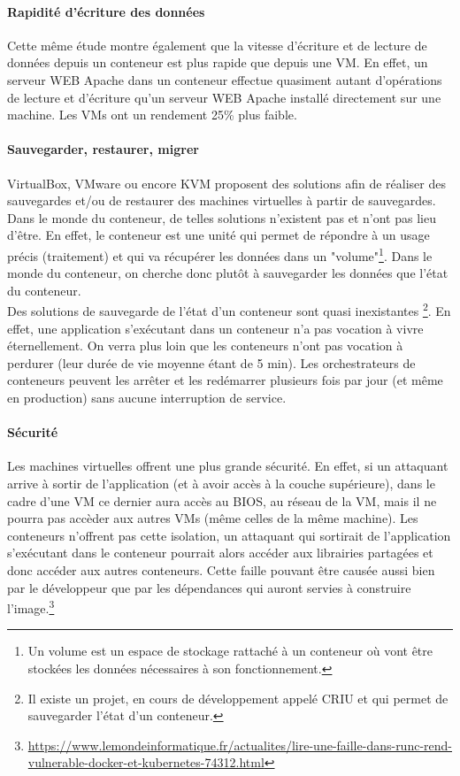 \documentclass[11pt,fleqn]{book} %
\begin{document}
\paragraph{Rapidité d'écriture des données}
Cette même étude montre également que la vitesse d'écriture et de lecture de données depuis un conteneur est plus rapide que depuis une VM. En effet, un serveur WEB Apache dans un conteneur effectue quasiment autant d'opérations de lecture et d'écriture qu'un serveur WEB Apache installé directement sur une machine. Les VMs ont un rendement 25\% plus faible. 

\paragraph{Sauvegarder, restaurer, migrer}
VirtualBox, VMware ou encore KVM proposent des solutions afin de réaliser des sauvegardes et/ou de restaurer des machines virtuelles à partir de sauvegardes.\\

Dans le monde du conteneur, de telles solutions n'existent pas et n'ont pas lieu d'être. En effet, le conteneur est une unité qui permet de répondre à un usage précis (traitement) et qui va récupérer les données dans un "volume"\footnote{Un volume est un espace de stockage rattaché à un conteneur où vont être stockées les données nécessaires à son fonctionnement.}. Dans le monde du conteneur, on cherche donc plutôt à sauvegarder les données que l'état du conteneur.\\  

Des solutions de sauvegarde de l'état d'un conteneur sont quasi inexistantes \footnote{Il existe un projet, en cours de développement appelé CRIU et qui permet de sauvegarder l'état d'un conteneur.}. En effet, une application s'exécutant dans un conteneur n'a pas vocation à vivre éternellement. On verra plus loin que les conteneurs n'ont pas vocation à perdurer (leur durée de vie moyenne étant de 5 min). Les orchestrateurs de conteneurs peuvent les arrêter et les redémarrer plusieurs fois par jour (et même en production) sans aucune interruption de service.

\paragraph{Sécurité}
Les machines virtuelles offrent une plus grande sécurité. En effet, si un attaquant arrive à sortir de l'application (et à avoir accès à la couche supérieure), dans le cadre d'une VM ce dernier aura accès au BIOS, au réseau de la VM, mais il ne pourra pas accèder aux autres VMs (même celles de la même machine). Les conteneurs n'offrent pas cette isolation, un attaquant qui sortirait de l'application s'exécutant dans le conteneur pourrait alors accéder aux librairies partagées et donc accéder aux autres conteneurs. Cette faille pouvant être causée aussi bien par le développeur que par les dépendances qui auront servies à construire l'image.\footnote{\url{https://www.lemondeinformatique.fr/actualites/lire-une-faille-dans-runc-rend-vulnerable-docker-et-kubernetes-74312.html}} 
\end{document}
